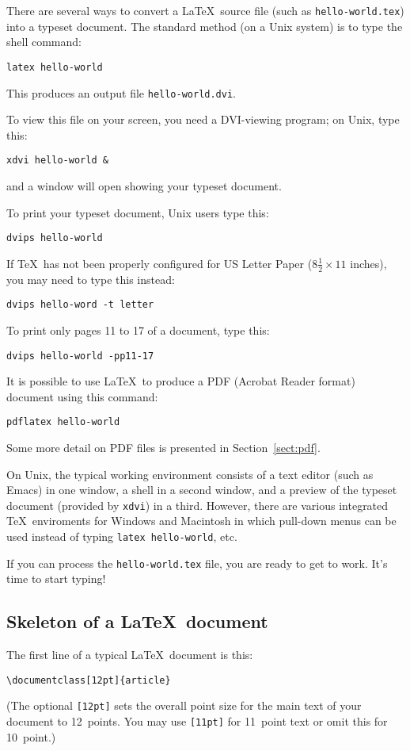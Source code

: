 \documentclass[12pt]{article}
\begin{document}
There are several ways to convert a \LaTeX\ source file (such as
\verb|hello-world.tex|) into a typeset document. The standard method
(on a Unix system) is to type the shell command:
\begin{verbatim}
latex hello-world
\end{verbatim}
This produces an output file \verb|hello-world.dvi|. 

To view this file on your screen, you need a DVI-viewing program; on
Unix, type this:
\begin{verbatim}
xdvi hello-world &
\end{verbatim}
and a window will open showing your typeset document. 

To print your typeset document, Unix users type this:
\begin{verbatim}
dvips hello-world
\end{verbatim}
If \TeX\ has not been properly configured for US Letter Paper
($8\frac12\times11$ inches), you may need to type this instead:
\begin{verbatim}
dvips hello-word -t letter
\end{verbatim}
To print only pages 11 to 17 of a document, type this:
\begin{verbatim}
dvips hello-world -pp11-17
\end{verbatim}

It is possible to use \LaTeX\ to produce a PDF (Acrobat Reader format)
document using this command:
\begin{verbatim}
pdflatex hello-world
\end{verbatim}
Some more detail on PDF files is presented in Section~\ref{sect:pdf}.

On Unix, the typical working environment consists of a text editor
(such as Emacs) in one window, a shell in a second window, and a
preview of the typeset document (provided by \verb|xdvi|) in a
third. However, there are various integrated \TeX\ enviroments for
Windows and Macintosh in which pull-down menus can be used instead of
typing \verb|latex hello-world|, etc.

If you can process the \verb|hello-world.tex| file, you are ready to
get to work. It's time to start typing!


\subsection{Skeleton of a \LaTeX\ document} 

The first line of a typical \LaTeX\ document is this:
\begin{verbatim}
\documentclass[12pt]{article}
\end{verbatim}
(The optional \verb|[12pt]| sets the overall point size for the main
text of your document to 12~points. You may use \verb|[11pt]| for
11~point text or omit this for 10~point.)
\end{document}
